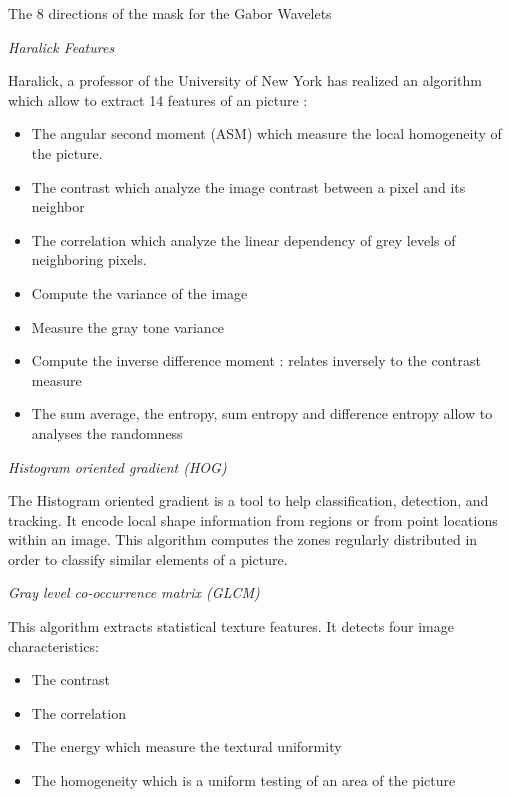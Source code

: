 
    The 8 directions of the mask for the Gabor Wavelets
    
\textit{Haralick Features}

Haralick, a professor of the University of New York has realized an algorithm which allow to extract 14 features of an picture : 

\begin{itemize}
\item The angular second moment (ASM) which measure the local homogeneity of the picture.
\end{itemize}
\begin{itemize}
\item The contrast which analyze the image contrast between a pixel and its neighbor
\end{itemize}
\begin{itemize}
\item The correlation which analyze the linear dependency of grey levels of neighboring pixels.
\end{itemize}
\begin{itemize}
\item Compute the variance of the image
\end{itemize}
\begin{itemize}
\item Measure the gray tone variance
\end{itemize}
\begin{itemize}
\item Compute the inverse difference moment : relates inversely to the contrast measure
\end{itemize}
\begin{itemize}
\item The sum average, the entropy, sum entropy and difference entropy allow to analyses the randomness
\end{itemize}

\textit{Histogram oriented gradient (HOG)}

The Histogram oriented gradient is a tool to help classification, detection, and tracking. It encode
local shape information from regions or from point locations within an image.
This algorithm computes the zones regularly distributed in order to classify similar elements of a picture. 

\textit{Gray level co-occurrence matrix (GLCM)}

This algorithm extracts statistical texture features.
It detects four image characteristics:
\begin{itemize}
\item The contrast
\end{itemize}
\begin{itemize}
\item The correlation 
\end{itemize}
\begin{itemize}
\item The energy which measure the textural uniformity
\end{itemize}
\begin{itemize}
\item The homogeneity which is a uniform testing of an area of the picture
\end{itemize}


